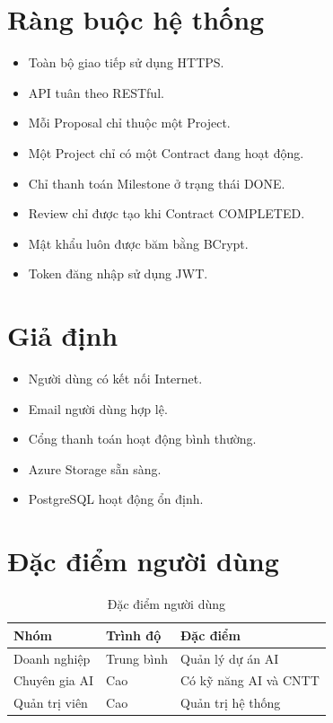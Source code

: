 \section{Ràng buộc hệ thống}

\begin{itemize}
\item Toàn bộ giao tiếp sử dụng HTTPS.
\item API tuân theo RESTful.
\item Mỗi Proposal chỉ thuộc một Project.
\item Một Project chỉ có một Contract đang hoạt động.
\item Chỉ thanh toán Milestone ở trạng thái DONE.
\item Review chỉ được tạo khi Contract COMPLETED.
\item Mật khẩu luôn được băm bằng BCrypt.
\item Token đăng nhập sử dụng JWT.
\end{itemize}

\section{Giả định}

\begin{itemize}
\item Người dùng có kết nối Internet.
\item Email người dùng hợp lệ.
\item Cổng thanh toán hoạt động bình thường.
\item Azure Storage sẵn sàng.
\item PostgreSQL hoạt động ổn định.
\end{itemize}

\section{Đặc điểm người dùng}

\begin{table}[H]
\centering
\caption{Đặc điểm người dùng}
\begin{tabular}{|p{4cm}|p{3cm}|p{7cm}|}
\hline
Nhóm & Trình độ & Đặc điểm \\ \hline
Doanh nghiệp & Trung bình & Quản lý dự án AI \\ \hline
Chuyên gia AI & Cao & Có kỹ năng AI và CNTT \\ \hline
Quản trị viên & Cao & Quản trị hệ thống \\ \hline
\end{tabular}
\end{table}

